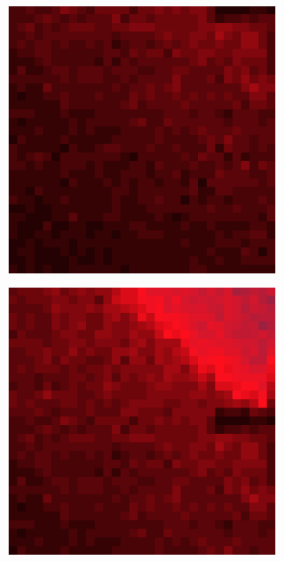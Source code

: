 \documentclass[10pt]{scrartcl}
\begin{document}
\begin{figure}[!ht]
    \vspace{-0.5in}
    \begin{subfigure}[b]{.3\linewidth}
        \centering
        \includegraphics[width=1.2\linewidth]{../plots_tables_images/1d1dcrop_0_0.eps}
    \end{subfigure}
    \begin{subfigure}[b]{.3\linewidth}
        \centering
        \includegraphics[width=1.2\linewidth]{../plots_tables_images/1d1dcrop_0_1.eps}

\end{subfigure}
\end{figure}
\end{document}
